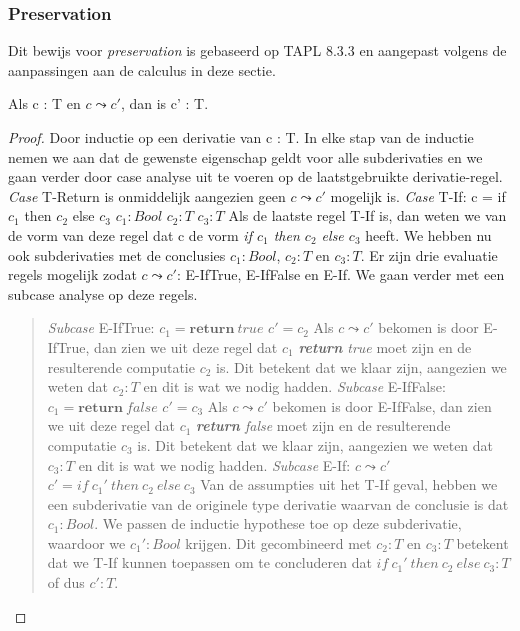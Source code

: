 \subsubsection{Preservation}
Dit bewijs voor \emph{preservation} is gebaseerd op TAPL 8.3.3 \cite{Pierce2002} en aangepast volgens de aanpassingen aan de calculus in deze sectie.

\begin{theorem}[Preservation]
Als c : T en $c \leadsto c'$, dan is c' : T.
\end{theorem}

\begin{proof}
    Door inductie op een derivatie van c : T. In elke stap van de inductie nemen we aan dat de gewenste eigenschap geldt voor alle subderivaties en we gaan verder door case analyse uit te voeren op de laatstgebruikte derivatie-regel.\newline
    \indent \textit{Case} T-Return is onmiddelijk aangezien geen $c \leadsto c'$ mogelijk is. \newline
    \indent \textit{Case} T-If: c = if $c_1$ then $c_2$ else $c_3$ \quad $c_1 : Bool$ \quad $c_2 : T$ \quad $c_3 : T$ \newline
    Als de laatste regel T-If is, dan weten we van de vorm van deze regel dat c de vorm \emph{if $c_1$ then $c_2$ else $c_3$} heeft. We hebben nu ook subderivaties met de conclusies  $c_1 : Bool$, $c_2 : T$ en $c_3 : T$. Er zijn drie evaluatie regels mogelijk zodat $c \leadsto c'$: E-IfTrue, E-IfFalse en E-If. We gaan verder met een subcase analyse op deze regels.
    \begin{quote}
        \textit{Subcase} E-IfTrue: $c_1 = \textbf{return} \  true$ \quad $c' = c_2$ \newline
        Als $c \leadsto c'$ bekomen is door E-IfTrue, dan zien we uit deze regel dat $c_1$ \emph{\textbf{return} true} moet zijn en de resulterende computatie $c_2$ is. Dit betekent dat we klaar zijn, aangezien we weten dat $c_2 : T$ en dit is wat we nodig hadden. \newline 
        \textit{Subcase} E-IfFalse: $c_1 = \textbf{return} \   false$ \quad $c' = c_3$ \newline
        Als $c \leadsto c'$ bekomen is door E-IfFalse, dan zien we uit deze regel dat $c_1$ \emph{\textbf{return} false} moet zijn en de resulterende computatie $c_3$ is. Dit betekent dat we klaar zijn, aangezien we weten dat $c_3 : T$ en dit is wat we nodig hadden. \newline
        \textit{Subcase} E-If: $c \leadsto c'$ \quad $c' = if \  c_1' \  then \  c_2 \  else \   c_3$
        Van de assumpties uit het T-If geval, hebben we een subderivatie van de originele type derivatie waarvan de conclusie is dat $c_1 : Bool$. We passen de inductie hypothese toe op deze subderivatie, waardoor we $c_1' : Bool$ krijgen. Dit gecombineerd met $c_2 : T$ en $c_3 : T$ betekent dat we T-If kunnen toepassen om te concluderen dat $if \  c_1' \  then \  c_2 \  else \  c_3 : T$ of dus $c' : T$.
    \end{quote}
    

\end{proof}
